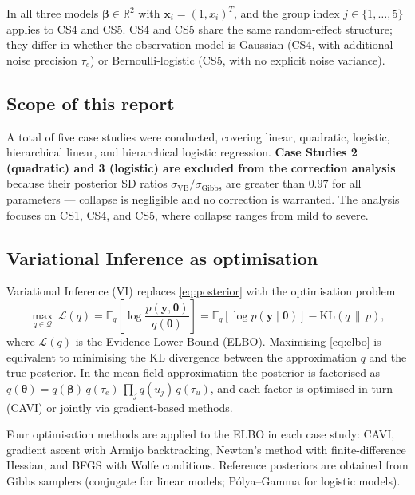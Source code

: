 \documentclass[11pt,a4paper]{article}
\newcommand{\E}{\mathbb{E}}
\newcommand{\R}{\mathbb{R}}
\begin{document}
\noindent
In all three models $\bm{\beta}\in\R^2$ with
$\bm{x}_i = (1, x_i)^T$,
and the group index $j\in\{1,\ldots,5\}$ applies to CS4 and CS5.
CS4 and CS5 share the same random-effect structure; they differ in whether the
observation model is Gaussian (CS4, with additional noise precision $\tau_e$) or
Bernoulli-logistic (CS5, with no explicit noise variance).

\subsection*{Scope of this report}

A total of five case studies were conducted, covering linear, quadratic, logistic,
hierarchical linear, and hierarchical logistic regression.
\textbf{Case Studies 2 (quadratic) and 3 (logistic) are excluded from the correction
analysis} because their posterior SD ratios $\sigma_{\mathrm{VB}}/\sigma_{\mathrm{Gibbs}}$
are greater than $0.97$ for all parameters --- collapse is negligible and no correction
is warranted.
The analysis focuses on CS1, CS4, and CS5, where collapse ranges from mild to severe.

\subsection*{Variational Inference as optimisation}

Variational Inference (VI) replaces \eqref{eq:posterior} with the optimisation problem
\begin{equation}
  \max_{q\in\mathcal{Q}}\,\mathcal{L}(q)
  = \E_{q}\!\left[\log\frac{p(\bm{y},\bm{\theta})}{q(\bm{\theta})}\right]
  = \E_q[\log p(\bm{y}\mid\bm{\theta})] - \mathrm{KL}(q\,\|\,p),
  \label{eq:elbo}
\end{equation}
where $\mathcal{L}(q)$ is the Evidence Lower Bound (ELBO).
Maximising \eqref{eq:elbo} is equivalent to minimising the KL divergence between
the approximation $q$ and the true posterior.
In the mean-field approximation the posterior is factorised as
$q(\bm{\theta}) = q(\bm{\beta})\,q(\tau_e)\,\prod_j q(u_j)\,q(\tau_u)$,
and each factor is optimised in turn (CAVI) or jointly via gradient-based methods.

Four optimisation methods are applied to the ELBO in each case study:
CAVI, gradient ascent with Armijo backtracking, Newton's method with finite-difference
Hessian, and BFGS with Wolfe conditions.
Reference posteriors are obtained from Gibbs samplers (conjugate for linear models;
P\'{o}lya--Gamma \parencite{Polson2013} for logistic models).
\end{document}
